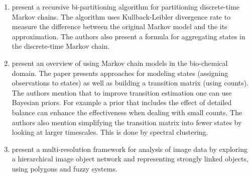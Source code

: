 \begin{enumerate}
	\item \cite{5746509} present a recursive bi-partitioning algorithm for partitioning discrete-time Markov chains. The 
	algorithm uses Kullback-Leibler divergence rate to measure the difference between the original Markov
	model and the its approximation. The authors also present a formula for aggregating states in the discrete-time
	Markov chain.
	\item \cite{pande-beauchamp-bowman:2010:methods:markov-model-review} present an overview of using Markov chain models in the bio-chemical domain. The paper
	presents approaches for modeling states (assigning observations to states) as well as building a transition
	matrix (using counts). The authors mention that to improve transition estimation one can use Bayesian priors.
	For example a prior that includes the effect of detailed balance can enhance the effectiveness when dealing with
	small counts. The authors also mention simplifying the transition matrix into fewer states by looking at larger
	timescales. This is done by spectral clustering.
	\item \cite{Benz2004239} present a multi-resolution framework for analysis of image data by exploring a hierarchical
	image object network and representing strongly linked objects, using polygons and fuzzy systems.
\end{enumerate}